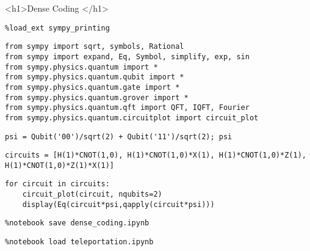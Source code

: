 <h1>Dense Coding </h1>

\begin{verbatim}
%load_ext sympy_printing
\end{verbatim}

\begin{verbatim}
from sympy import sqrt, symbols, Rational
from sympy import expand, Eq, Symbol, simplify, exp, sin
from sympy.physics.quantum import *
from sympy.physics.quantum.qubit import *
from sympy.physics.quantum.gate import *
from sympy.physics.quantum.grover import *
from sympy.physics.quantum.qft import QFT, IQFT, Fourier
from sympy.physics.quantum.circuitplot import circuit_plot
\end{verbatim}

\begin{verbatim}
psi = Qubit('00')/sqrt(2) + Qubit('11')/sqrt(2); psi
\end{verbatim}

\begin{verbatim}
circuits = [H(1)*CNOT(1,0), H(1)*CNOT(1,0)*X(1), H(1)*CNOT(1,0)*Z(1), H(1)*CNOT(1,0)*Z(1)*X(1)]
\end{verbatim}

\begin{verbatim}
for circuit in circuits:
    circuit_plot(circuit, nqubits=2)
    display(Eq(circuit*psi,qapply(circuit*psi)))
\end{verbatim}

\begin{verbatim}
%notebook save dense_coding.ipynb
\end{verbatim}

\begin{verbatim}
%notebook load teleportation.ipynb
\end{verbatim}

